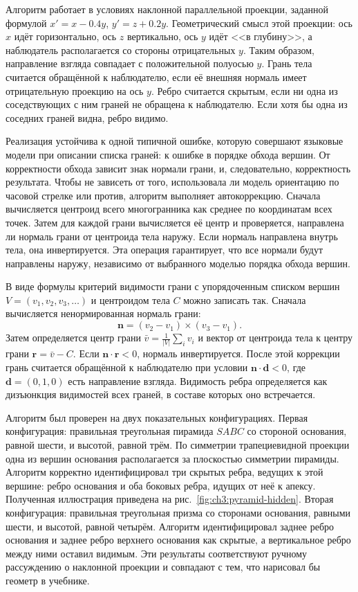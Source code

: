 Алгоритм работает в условиях наклонной параллельной проекции, заданной формулой \(x' = x - 0.4y\), \(y' = z + 0.2y\). Геометрический смысл этой проекции: ось \(x\) идёт горизонтально, ось \(z\) вертикально, ось \(y\) идёт <<в глубину>>, а наблюдатель располагается со стороны отрицательных \(y\). Таким образом, направление взгляда совпадает с положительной полуосью \(y\). Грань тела считается обращённой к наблюдателю, если её внешняя нормаль имеет отрицательную проекцию на ось \(y\). Ребро считается скрытым, если ни одна из соседствующих с ним граней не обращена к наблюдателю. Если хотя бы одна из соседних граней видна, ребро видимо.

Реализация устойчива к одной типичной ошибке, которую совершают языковые модели при описании списка граней: к ошибке в порядке обхода вершин. От корректности обхода зависит знак нормали грани, и, следовательно, корректность результата. Чтобы не зависеть от того, использовала ли модель ориентацию по часовой стрелке или против, алгоритм выполняет автокоррекцию. Сначала вычисляется центроид всего многогранника как среднее по координатам всех точек. Затем для каждой грани вычисляется её центр и проверяется, направлена ли нормаль грани от центроида тела наружу. Если нормаль направлена внутрь тела, она инвертируется. Эта операция гарантирует, что все нормали будут направлены наружу, независимо от выбранного моделью порядка обхода вершин.

В виде формулы критерий видимости грани с упорядоченным списком вершин \(V = (v_1, v_2, v_3, \ldots)\) и центроидом тела \(C\) можно записать так. Сначала вычисляется ненормированная нормаль грани:
\begin{equation}
\mathbf{n} = (v_2 - v_1) \times (v_3 - v_1).
\label{eq:ch3:visibility}
\end{equation}
Затем определяется центр грани \(\bar{v} = \frac{1}{|V|}\sum_i v_i\) и вектор от центроида тела к центру грани \(\mathbf{r} = \bar{v} - C\). Если \(\mathbf{n} \cdot \mathbf{r} < 0\), нормаль инвертируется. После этой коррекции грань считается обращённой к наблюдателю при условии \(\mathbf{n} \cdot \mathbf{d} < 0\), где \(\mathbf{d} = (0, 1, 0)\) есть направление взгляда. Видимость ребра определяется как дизъюнкция видимостей всех граней, в составе которых оно встречается.

Алгоритм был проверен на двух показательных конфигурациях. Первая конфигурация: правильная треугольная пирамида \(SABC\) со стороной основания, равной шести, и высотой, равной трём. По симметрии трапециевидной проекции одна из вершин основания располагается за плоскостью симметрии пирамиды. Алгоритм корректно идентифицировал три скрытых ребра, ведущих к этой вершине: ребро основания и оба боковых ребра, идущих от неё к апексу. Полученная иллюстрация приведена на рис.~\ref{fig:ch3:pyramid-hidden}. Вторая конфигурация: правильная треугольная призма со сторонами основания, равными шести, и высотой, равной четырём. Алгоритм идентифицировал заднее ребро основания и заднее ребро верхнего основания как скрытые, а вертикальное ребро между ними оставил видимым. Эти результаты соответствуют ручному рассуждению о наклонной проекции и совпадают с тем, что нарисовал бы геометр в учебнике.


